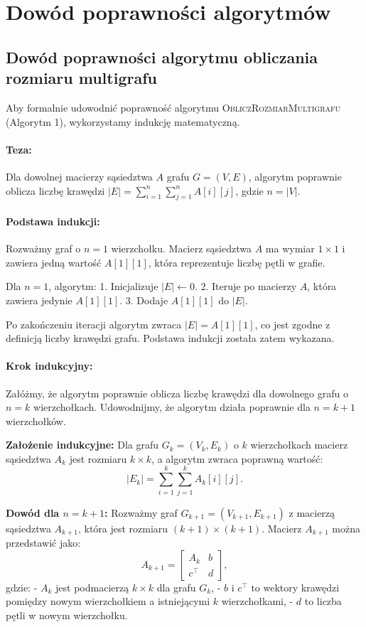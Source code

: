 \section{Dowód poprawności algorytmów}

\subsection{Dowód poprawności algorytmu obliczania rozmiaru multigrafu}

Aby formalnie udowodnić poprawność algorytmu \textsc{ObliczRozmiarMultigrafu} (Algorytm 1), wykorzystamy indukcję matematyczną.

\paragraph{Teza:}
Dla dowolnej macierzy sąsiedztwa \( A \) grafu \( G = (V, E) \), algorytm poprawnie oblicza liczbę krawędzi \( |E| = \sum_{i=1}^{n} \sum_{j=1}^{n} A[i][j] \), gdzie \( n = |V| \).

\paragraph{Podstawa indukcji:} 
Rozważmy graf o \( n = 1 \) wierzchołku. Macierz sąsiedztwa \( A \) ma wymiar \( 1 \times 1 \) i zawiera jedną wartość \( A[1][1] \), która reprezentuje liczbę pętli w grafie.

Dla \( n = 1 \), algorytm:
1. Inicjalizuje \( |E| \gets 0 \).
2. Iteruje po macierzy \( A \), która zawiera jedynie \( A[1][1] \).
3. Dodaje \( A[1][1] \) do \( |E| \).

Po zakończeniu iteracji algorytm zwraca \( |E| = A[1][1] \), co jest zgodne z definicją liczby krawędzi grafu. Podstawa indukcji została zatem wykazana.

\paragraph{Krok indukcyjny:} 
Załóżmy, że algorytm poprawnie oblicza liczbę krawędzi dla dowolnego grafu o \( n = k \) wierzchołkach. Udowodnijmy, że algorytm działa poprawnie dla \( n = k+1 \) wierzchołków.

\textbf{Założenie indukcyjne:} 
Dla grafu \( G_k = (V_k, E_k) \) o \( k \) wierzchołkach macierz sąsiedztwa \( A_k \) jest rozmiaru \( k \times k \), a algorytm zwraca poprawną wartość:
\[
|E_k| = \sum_{i=1}^{k} \sum_{j=1}^{k} A_k[i][j].
\]

\textbf{Dowód dla \( n = k+1 \):} 
Rozważmy graf \( G_{k+1} = (V_{k+1}, E_{k+1}) \) z macierzą sąsiedztwa \( A_{k+1} \), która jest rozmiaru \( (k+1) \times (k+1) \). Macierz \( A_{k+1} \) można przedstawić jako:
\[
A_{k+1} =
\begin{bmatrix}
A_k & b \\
c^\top & d
\end{bmatrix},
\]
gdzie:
- \( A_k \) jest podmacierzą \( k \times k \) dla grafu \( G_k \),
- \( b \) i \( c^\top \) to wektory krawędzi pomiędzy nowym wierzchołkiem a istniejącymi \( k \) wierzchołkami,
- \( d \) to liczba pętli w nowym wierzchołku.

